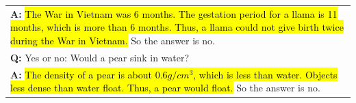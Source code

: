 \begin{table}[H]
\begin{tabular}{p{\linewidth}}
        \textbf{A:} \hl{The War in Vietnam was 6 months. The gestation period for a llama is 11 months, which is more than 6 months. Thus, a llama could not give birth twice during the War in Vietnam.} So the answer is no. \\
        \vspace{0mm}
        \textbf{Q:} Yes or no: Would a pear sink in water? \\
        \vspace{-1mm}
        \textbf{A:} \hl{The density of a pear is about $0.6 g/cm^3$, which is less than water. Objects less dense than water float. Thus, a pear would float.} So the answer is no. \\
        \bottomrule
    \end{tabular}
    \label{tab:appendix-strategyqa-prompt}
\end{table}
\endgroup